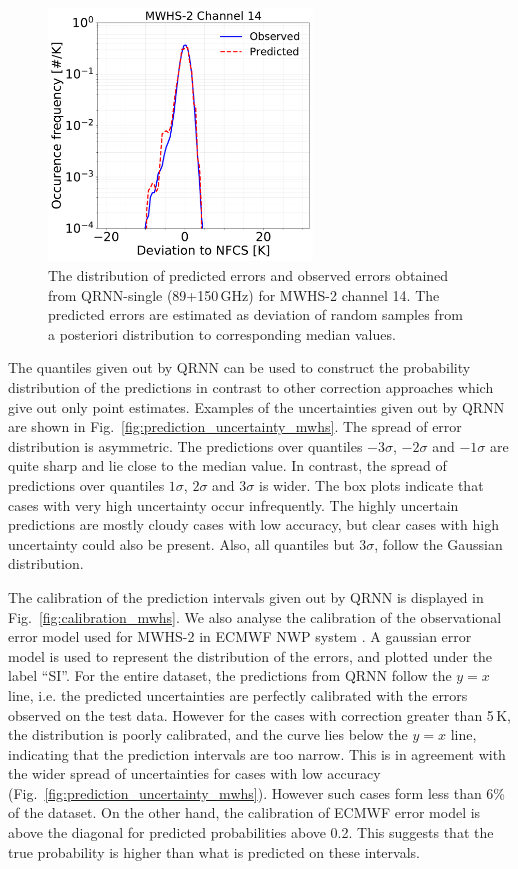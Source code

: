 \documentclass[amt, manuscript]{copernicus}
\begin{document}
\begin{figure}[t]
	\includegraphics[width=70mm]{Figures/fig07.pdf}	
	\caption{The distribution of predicted errors and observed errors  obtained from QRNN-single (89+150\,GHz) for MWHS-2 channel 14. The predicted errors are estimated as deviation of random samples from a posteriori distribution to corresponding median values.}
	\label{fig:predicted_errors_mwhs}	
\end{figure}

The quantiles given out by QRNN can be used to construct the probability distribution of the predictions in contrast to other correction approaches which give out only point estimates. Examples of the uncertainties given out by QRNN are shown in Fig.~\ref{fig:prediction_uncertainty_mwhs}. The spread of error distribution is asymmetric. The predictions over quantiles $-3\sigma$, $-2\sigma$ and $-1\sigma$ are quite sharp and lie close to the median value. In contrast, the spread of predictions over quantiles $1\sigma$, $2\sigma$ and $3\sigma$ is wider. The box plots indicate that cases with very high uncertainty occur infrequently. The highly uncertain predictions are mostly cloudy cases with low accuracy, but clear cases with high uncertainty could also be present. Also, all quantiles but  $3\sigma$, follow the Gaussian distribution.  

The calibration of the prediction intervals given out by QRNN is displayed in Fig.~\ref{fig:calibration_mwhs}. We also analyse the calibration of the observational error model used for MWHS-2 in ECMWF NWP system \citep{lawrence2018FY3C}. A gaussian error model is used to represent the distribution of the errors, and plotted under the label ``SI''. For the entire dataset, the predictions from QRNN follow the $y=x$ line, i.e. the predicted uncertainties are perfectly calibrated with the errors observed on the test data. However for the cases with correction greater than 5\,K, the distribution is poorly calibrated, and the curve lies below the $y =x$ line, indicating that the prediction intervals are too narrow. This is in agreement with the wider spread of uncertainties for cases with low accuracy (Fig.~\ref{fig:prediction_uncertainty_mwhs}). However such cases form less than 6\% of the dataset. On the other hand, the calibration of ECMWF error model is above the diagonal for predicted probabilities above 0.2. This suggests that the true probability is higher than what is predicted on these intervals. 
\end{document}

